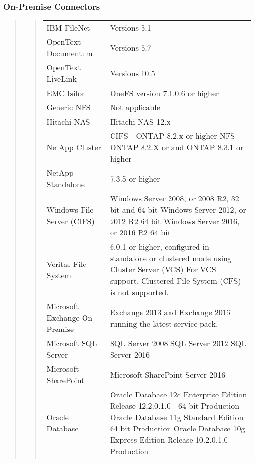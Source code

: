 \documentclass[letterpaper,10pt,english]{sphinxmanual}
\begin{document}
\subsubsection{On-Premise Connectors}
\label{\detokenize{mcdmp_app_ug:on-premise-connectors}}\begin{quote}

\begin{quote}


\begin{savenotes}\sphinxattablestart
\centering
\begin{tabulary}{\linewidth}[t]{|T|T|}
\hline
{}\relax &\relax \\
\hline
IBM FileNet
&
Versions 5.1
\\
\hline
OpenText Documentum
&
Versions 6.7
\\
\hline
OpenText LiveLink
&
Versions 10.5
\\
\hline
EMC Isilon
&
OneFS version 7.1.0.6 or higher
\\
\hline
Generic NFS
&
Not applicable
\\
\hline
Hitachi NAS
&
Hitachi NAS 12.x
\\
\hline
NetApp Cluster
&
CIFS - ONTAP 8.2.x or higher
NFS - ONTAP 8.2.X or and ONTAP 8.3.1 or higher
\\
\hline
NetApp Standalone
&
7.3.5 or higher
\\
\hline
Windows File Server (CIFS)
&
Windows Server 2008, or 2008 R2, 32 bit and 64 bit
Windows Server 2012, or 2012 R2 64 bit
Windows Server 2016, or 2016 R2 64 bit
\\
\hline
Veritas File System
&
6.0.1 or higher, configured in standalone or clustered
mode  using Cluster Server (VCS)
For VCS support, Clustered File System (CFS) is
not supported.
\\
\hline
Microsoft Exchange On-Premise
&
Exchange 2013 and Exchange 2016 running the latest
service pack.
\\
\hline
Microsoft SQL Server
&
SQL Server 2008
SQL Server 2012
SQL Server 2016
\\
\hline
Microsoft SharePoint
&
Microsoft SharePoint Server 2016
\\
\hline
Oracle Database
&
Oracle Database 12c Enterprise Edition Release 12.2.0.1.0 -
64-bit Production
Oracle Database 11g Standard Edition 64-bit Production
Oracle Database 10g Express Edition Release 10.2.0.1.0 -
Production
\\
\hline
\end{tabulary}
\par
\sphinxattableend\end{savenotes}
\end{quote}
\end{quote}
\end{document}
